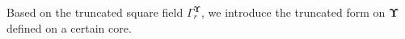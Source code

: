 \documentclass[11pt,letterpaper]{amsart}
\newcommand{\set}[1]{\left\{#1\right\}}							%
\newcommand{\tparen}[1]{\big({#1}\big)}
\DeclareMathOperator{\car}{\mathbf 1}
\newcommand{\cdc}{\Gamma}
\newcommand{\dUpsilon}{{\mathbf \Upsilon}}
\newcommand{\U}{\dUpsilon}
\renewcommand{\1}{\mathbf 1}
\numberwithin{equation}{section}
\theoremstyle{plain}
\newtheorem{lem}[thm]{Lemma}%
\theoremstyle{definition}
\theoremstyle{remark}
\begin{document}
Based on the truncated square field $\cdc^\U_r$, we introduce the truncated form on $\U$ defined on a certain core. 
\end{document}
